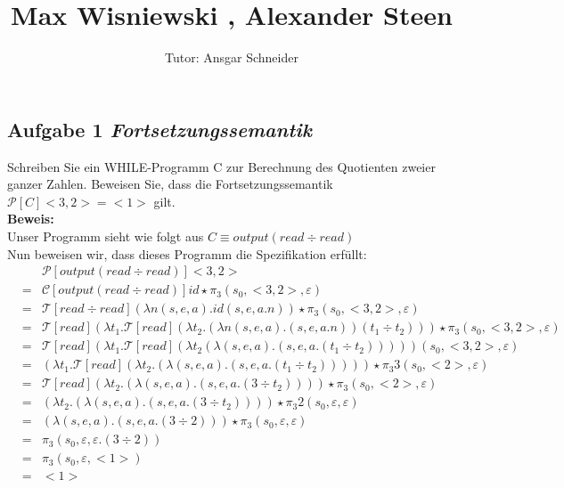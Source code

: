 \documentclass[11pt,a4paper,ngerman]{article}
\author{Tutor: Ansgar Schneider}
\date{}
\title{Max Wisniewski , Alexander Steen}
\begin{document}
   
\maketitle
\thispagestyle{fancy}
\newcommand{\A}{\mathbb{A}}

\subsection*{Aufgabe 1 \mdseries\itshape Fortsetzungssemantik}

   Schreiben Sie ein WHILE-Programm C zur Berechnung des Quotienten zweier ganzer Zahlen. Beweisen
   Sie, dass die Fortsetzungssemantik $\mathcal{P} [C] <3,2> = <1>$ gilt.\\

\textbf{Beweis:}\\
   Unser Programm sieht wie folgt aus
   $C \equiv output (read \div read)$\\

   Nun beweisen wir, dass dieses Programm die Spezifikation erfüllt:\\
   $$\begin{array}{rcl}
      &&\mathcal{P}[output (read \div read)] <3,2> \\&=& \mathcal{C}[output (read \div read)] id \star \pi_3
         (s_0,<3,2>, \varepsilon)\\
      &=& \mathcal{T}[read \div read] (\lambda n(s,e,a). id (s,e,a.n)) \star \pi_3 (s_0,<3,2>, \varepsilon)\\
      &=& \mathcal{T}[read] (\lambda t_1. \mathcal{T}[read]
         (\lambda t_2. (\lambda n (s,e,a). (s,e,a.n)) (t_1 \div t_2)))\star \pi_3 (s_0,<3,2>, \varepsilon)\\
      &=& \mathcal{T}[read] (\lambda t_1. \mathcal{T}[read] 
         (\lambda t_2 (\lambda (s,e,a).(s,e,a.(t_1 \div t_2))))) (s_0,<3,2>, \varepsilon)\\
      &=& (\lambda t_1. \mathcal{T}[read](\lambda t_2. (\lambda (s,e,a).(s,e,a.(t_1 \div t_2))))) 
         \star \pi _3 3 (s_0,<2>,\varepsilon)\\
      &=& \mathcal{T}[read](\lambda t_2.(\lambda (s,e,a).(s,e,a.(3 \div t_2)))) \star \pi_3 
         (s_0,<2>,\varepsilon)\\
      &=& (\lambda t_2.(\lambda (s,e,a).(s,e,a.(3 \div t_2)))) \star \pi_3 2 (s_0,\varepsilon,\varepsilon)\\
      &=& (\lambda (s,e,a).(s,e,a.(3 \div 2))) \star \pi_3 (s_0, \varepsilon, \varepsilon)\\
      &=& \pi_3 (s_0, \varepsilon, \varepsilon.(3 \div 2))\\
      &=& \pi_3 (s_0, \varepsilon, <1>)\\
      &=& <1>
   \end{array}$$
\end{document}
